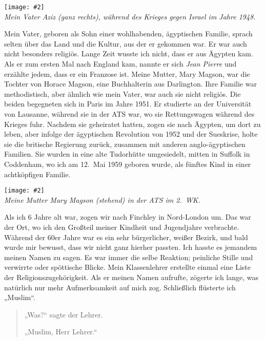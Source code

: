 \documentclass[12pt]{memoir}
\newcommand{\img}[3]{\begin{center}%
\texttt{[image: \#2]}\\{\small\em#3}%
\end{center}}
\begin{document}
\img{scale=0.8}{Hassans_Father.jpg}
{Mein Vater Aziz (ganz rechts),
während des Krieges gegen Israel im Jahre 1948.}

Mein Vater, geboren als Sohn einer wohlhabenden, ägyptischen Familie,
sprach selten über das Land und die Kultur, aus der er gekommen war.
Er war auch nicht besonders religiös.
Lange Zeit wusste ich nicht, dass er aus Ägypten kam.
Als er zum ersten Mal nach England kam,
nannte er sich \emph{Jean Pierre} und erzählte jedem, dass er ein Franzose ist.
Meine Mutter, Mary Magson, war die Tochter von Horace Magson,
eine Buchhalterin aus Darlington.
Ihre Familie war methodistisch, aber ähnlich wie mein Vater,
war auch sie nicht religiös.
Die beiden begegneten sich in Paris im Jahre 1951.
Er studierte an der Universität von Lausanne, während sie in der ATS war,
wo sie Rettungswagen während des Krieges fuhr.
Nachdem sie geheiratet hatten, zogen sie nach Ägypten, um dort zu leben,
aber infolge der ägyptischen Revolution von 1952 und der Sueskrise,
holte sie die britische Regierung zurück,
zusammen mit anderen anglo-ägyptischen Familien.
Sie wurden in eine alte Tudorhütte umgesiedelt,
mitten in Suffolk in Coddenham, wo ich am 12.\ Mai 1959 geboren wurde,
als fünftes Kind in einer achtköpfigen Familie.

\img{scale=0.7}{Hassans_Mother.jpg}
{Meine Mutter Mary Magson (stehend) in der ATS im 2.\ WK.}

Als ich 6 Jahre alt war, zogen wir nach Finchley in Nord-London um.
Das war der Ort, wo ich den Großteil
meiner Kindheit und Jugendjahre verbrachte.
Während der 60er Jahre war es ein sehr bürgerlicher, weißer Bezirk,
und bald wurde mir bewusst, dass wir nicht ganz hierher passten.
Ich hasste es jemandem meinen Namen zu sagen.
Es war immer die selbe Reaktion;
peinliche Stille und verwirrte oder spöttische Blicke.
Mein Klassenlehrer erstellte einmal eine Liste der Religionszugehörigkeit.
Als er meinen Namen aufrufte, zögerte ich lange,
was natürlich nur mehr Aufmerksamkeit auf mich zog.
Schließlich flüsterte ich „Muslim“.

\begin{quote}
„Was?“ sagte der Lehrer.

„Muslim, Herr Lehrer.“
\end{quote}
\end{document}
